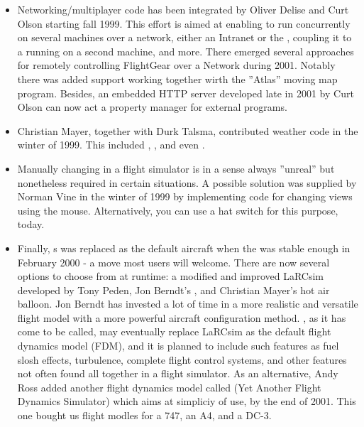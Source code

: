 \begin{itemize}
\item Networking/multiplayer
 code has been integrated by Oliver Delise  and Curt
Olson starting fall 1999. This effort is aimed at enabling
\FlightGear{}  to run concurrently on several machines over a network, either an Intranet
or the , coupling it to a  running on a second
machine, and more. There emerged several approaches for remotely controlling FlightGear over a Network during 2001. Notably there was added support working together wirth the ''Atlas'' moving map program. Besides, an embedded HTTP server developed late in 2001 by Curt Olson can now act a property manager for external programs.

\item Christian Mayer,   together with Durk Talsma,
contributed weather code in the winter of 1999. This included ,
, and even .

\item Manually changing  in a flight simulator is in a sense always ''unreal'' but
nonetheless required in certain situations. A possible solution was supplied by Norman
Vine in the winter of 1999 by implementing code for changing views
using the mouse. Alternatively, you can use a hat switch for this purpose, today.

\item Finally, s  was replaced as the default aircraft
 when the  was stable enough in February 2000 - a move most users will welcome. There are now several  options to choose from at runtime: a modified and improved LaRCsim  developed by Tony Peden, Jon Berndt's
 , and Christian Mayer's  hot
air balloon. Jon Berndt has invested a lot of time in a more
realistic and versatile flight model with a more powerful aircraft configuration method.
\JSBSim, as it has come to be called, may eventually replace LaRCsim as the default
flight dynamics model (FDM), and it is planned to include such features as fuel slosh
effects, turbulence, complete flight control systems, and other features not often found
all together in a flight simulator. As an alternative, Andy Ross added another flight dynamics model called \YASim{} (Yet Another Flight Dynamics Simulator) which aims at simpliciy of use, by the end of 2001. This one bought us flight modles for a 747, an A4, and a DC-3.


\end{itemize}

